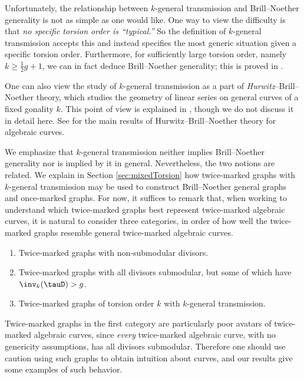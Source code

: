 Unfortunately, the relationship between $k$-general transmission and Brill--Noether generality is not as simple as one would like. One way to view the difficulty is that \emph{no specific torsion order is ``typical.''} So the definition of $k$-general transmission accepts this and instead specifies the most generic situation given a specific torsion order. Furthermore, for sufficiently large torsion order, namely $k \geq \frac12 g + 1$, we can in fact deduce Brill--Noether generality; this is proved in .

One can also view the study of $k$-general transmission as a part of \emph{Hurwitz}--Brill--Noether theory, which studies the geometry of linear series on general curves of a fixed gonality $k$. This point of view is explained in \cite{Pfl17}, though we do not discuss it in detail here. See \cite{larsonHBN,larsonLarsonVogt} for the main results of Hurwitz--Brill--Noether theory for algebraic curves.

We emphasize that $k$-general transmission neither implies Brill--Noether generality nor is implied by it in general. Nevertheless, the two notions are related.
We explain in Section \ref{sec:mixedTorsion} how twice-marked graphs with $k$-general transmission may be used to construct Brill--Noether general graphs and once-marked graphs. For now, it suffices to remark that, when working to understand which twice-marked graphs best represent twice-marked algebraic curves, it is natural to consider three categories, in order of how well the twice-marked graphs resemble general twice-marked algebraic curves.

\begin{enumerate}[label = \arabic*)]
    \item Twice-marked graphs with non-submodular divisors.
    \item Twice-marked graphs with all divisors submodular, but some of which have $\inv_k(\tauD) > g$.
    \item Twice-marked graphs of torsion order $k$ with $k$-general transmission.
\end{enumerate}

Twice-marked graphs in the first category are particularly poor avatars of twice-marked algebraic curves, since \emph{every} twice-marked algebraic curve, with no genericity assumptions, has all divisors submodular. Therefore one should use caution using such graphs to obtain intuition about curves, and our results give some examples of such behavior.

